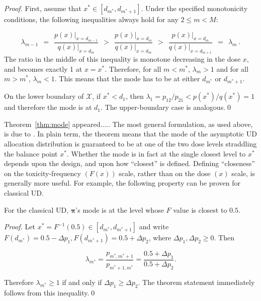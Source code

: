 \begin{proof} First, assume that $x^*\in\left[d_{m^*},d_{m^*+1}\right]$. Under the specified monotonicity conditions, the following inequalities always hold for any $2\leq m<M$:

\begin{equation}\label{eq:gammas1}
\lambda_{m-1}\ \ =\ \ \frac{p(x)\big |_{x=d_{m-1}}}{q(x)\big |_{x=d_m}}\ \ >\ \ \frac{p(x)\big |_{x=d_m}}{q(x)\big |_{x=d_{m}}}\ \ >\ \ \frac{p(x)\big |_{x=d_m}}{q(x)\big |_{x=d_{m+1}}}\ \ =\ \ \lambda_m\ .
\end{equation}
\noindent The ratio in the middle of this inequality is monotone decreasing in the dose $x$, and becomes exactly 1 at $x=x^*$. Therefore, for all $m<m^*$, $\lambda_m>1$ and for all $m>m^*$, $\lambda_m<1$. This means that the mode has to be at either $d_{m^*}$ or $d_{m^*+1}$.

\noindent On the lower boundary of $\mathcal{X}$, if $x^*<d_1$, then $\lambda_1=p_{12}/p_{21}<p\left(x^*\right)/q\left(x^*\right)=1$ and therefore the mode is at $d_1$. The upper-boundary case is analogous.\qed\end{proof}

Theorem~\ref{thm:mode} appeared..... The most general formulation, as used above, is due to \citep{Oron:Hoff:thek:2009}. In plain term, the theorem means that the mode of the asymptotic UD allocation distribution is guaranteed to be at one of the two dose levels straddling the balance point $x^*$. Whether the mode is in fact at the single closest level to $x^*$ depends upon the design, and upon how ``closest'' is defined. Defining ``closeness'' on the toxicity-frequency $\left(F(x)\right)$ scale, rather than on the dose $(x)$ scale, is generally more useful. For example, the following property can be proven for classical UD.

\begin{thm}\label{thm:modesud}
For the classical UD, $\boldsymbol{\pi}$'s mode is at the level whose $F$ value is closest to $0.5$.
\end{thm}

\begin{proof} Let $x^*=F^{-1}(0.5)\in [d_{m^*},d_{m^*+1}]$ and write $F\left(d_{m^*}\right)=0.5-\Delta p_1,F\left(d_{m^*+1}\right)=0.5+\Delta p_2$, where $\Delta p_1,\Delta p_2\geq 0$. Then

\begin{equation}\label{eq:sudmode}
\lambda_{m^*}=\frac{p_{m^*,m^*+1}}{p_{m^*+1,m^*}}=\frac{0.5+\Delta p_1}{0.5+\Delta p_2}.
\end{equation}

\noindent Therefore $\lambda_{m^*}\geq 1$ if and only if $\Delta p_1\geq\Delta p_2$. The theorem statement immediately follows from this inequality.\qed
\end{proof}

